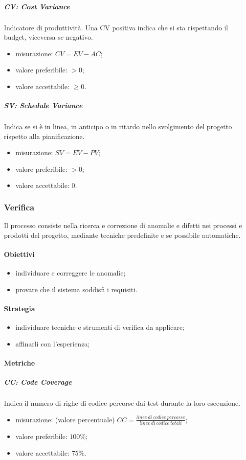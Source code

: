 		\subparagraph{CV: Cost Variance}
			Indicatore di produttività. Una CV positiva indica che si sta rispettando il budget, viceversa se negativo.
			\begin{itemize}
				\item misurazione: $CV = EV - AC$;
				\item valore preferibile: $ > 0$;
				\item valore accettabile: $ \geq 0$.
			\end{itemize}
		\subparagraph{SV: Schedule Variance}
			Indica se si è in linea, in anticipo o in ritardo nello svolgimento del progetto rispetto alla pianificazione.
			\begin{itemize}
				\item misurazione: $SV = EV - PV$;
				\item valore preferibile: $ > 0$;
				\item valore accettabile: 0.
			\end{itemize}
			
	\subsubsection{Verifica}
	Il processo consiste nella ricerca e correzione di anomalie e difetti nei processi e prodotti del progetto, mediante tecniche predefinite e se possibile automatiche.
		\paragraph{Obiettivi}
		\begin{itemize}
			\item individuare e correggere le anomalie;
			\item provare che il sistema soddisfi i requisiti.
		\end{itemize}	
		\paragraph{Strategia}
		\begin{itemize}
			\item individuare tecniche e strumenti di verifica da applicare;
			\item affinarli con l'esperienza;
		\end{itemize}	
		\paragraph{Metriche}
			\subparagraph{CC: Code Coverage}
				Indica il numero di righe di codice percorse dai test durante la loro esecuzione. 
				\begin{itemize}
					\item misurazione: (valore percentuale) $CC = \frac{linee\ di\ codice\ percorse}{linee\ di\ codice\ totali}$;
					\item valore preferibile: $100\%$;
					\item valore accettabile: $75\%$.
				\end{itemize}

